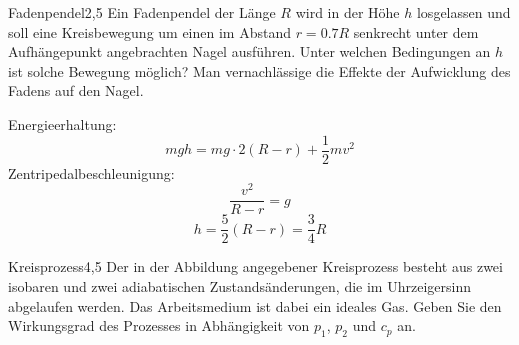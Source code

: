 


\begin{problem}{Fadenpendel}{2,5}
Ein Fadenpendel der Länge $R$ wird in der Höhe $h$ losgelassen und soll eine Kreisbewegung um einen im Abstand $r=0.7 R$ senkrecht unter dem Aufhängepunkt angebrachten Nagel ausführen. Unter welchen Bedingungen an $h$ ist solche Bewegung möglich? Man vernachlässige die Effekte der Aufwicklung des Fadens auf den Nagel.
\begin{solution}
Energieerhaltung:
\[
mgh = mg\cdot 2(R-r)+\frac12 mv^2
\]
Zentripedalbeschleunigung:
\[
\frac{v^2}{R-r} = g
\]
\[
h = \frac 5 2 (R-r) = \frac 3 4 R
\]
\end{solution}
\end{problem}

\begin{problem}{Kreisprozess}{4,5}
Der in der Abbildung angegebener Kreisprozess besteht aus zwei isobaren und zwei adiabatischen Zustandsänderungen, die im Uhrzeigersinn abgelaufen werden. Das Arbeitsmedium ist dabei ein ideales Gas. Geben Sie den Wirkungsgrad des Prozesses in Abhängigkeit von $p_1$, $p_2$ und $c_p$ an.
\end{problem}

